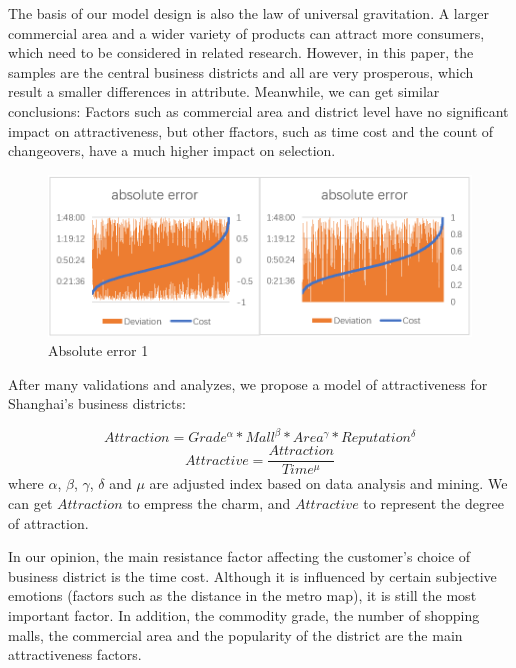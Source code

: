 \documentclass[journal]{IEEEtran}
\begin{document}
The basis of our model design is also the law of universal gravitation. A larger commercial area and a wider variety of products can attract more consumers, which need to be considered in related research. However, in this paper, the samples are the central business districts and all are very prosperous, which result a smaller differences in attribute. Meanwhile, we can get similar conclusions: Factors such as commercial area and district level have no significant impact on attractiveness, but other ffactors, such as time cost and the count of changeovers, have a much higher impact on selection.

\begin{figure}[tb]
\centering
\includegraphics[width=1\columnwidth]{figure6.png}
\caption{Absolute error 1}
\label{fig:Absolute-error 1}
\end{figure}

After many validations and analyzes, we propose a model of attractiveness for Shanghai's business districts:

\begin{equation}
Attraction=Grade^{\alpha}*Mall^{\beta}*Area^{\gamma}*Reputation^{\delta} 
\end{equation}
\begin{equation}
Attractive=\frac{Attraction}{Time^{\mu}}
\end{equation}
where $\alpha$, $\beta$, $\gamma$, $\delta$ and $\mu$ are adjusted index based on data analysis and mining. We can get $Attraction$ to empress the charm, and $Attractive$ to represent the degree of attraction.

In our opinion, the main resistance factor affecting the customer's choice of business district is the time cost. Although it is influenced by certain subjective emotions (factors such as the distance in the metro map), it is still the most important factor. In addition, the commodity grade, the number of shopping malls, the commercial area and the popularity of the district are the main attractiveness factors.
\end{document}
